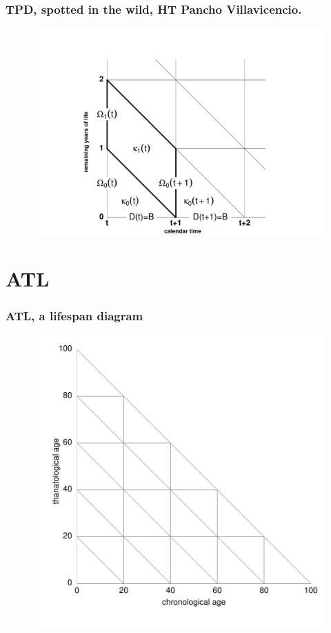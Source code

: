 \documentclass[20pt]{beamer}
\begin{document}
\begin{frame}
\frametitle{TPD, \small{spotted in the wild, HT Pancho Villavicencio.}}
\begin{figure}[b]
    \centering
    \includegraphics{Figures/LabPres/TPDexample_Pancho.pdf}
\end{figure} 
\end{frame}

\section{ATL}
\begin{frame}
\frametitle{ATL, a lifespan diagram}
\begin{figure}[b]
    \centering
    \includegraphics{Figures/LabPres/ATL1.pdf}
\end{figure} 
\end{frame}
\end{document}
